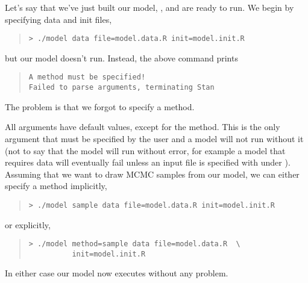 Let's say that we've just built our model, , and are ready to run.
We begin by specifying data and init files,
%
\begin{quote}
\begin{Verbatim}[fontshape=sl]
> ./model data file=model.data.R init=model.init.R
\end{Verbatim}
\end{quote}
%
but our model doesn't run.  Instead, the above command prints
%
\begin{quote}
\begin{Verbatim}
A method must be specified!
Failed to parse arguments, terminating Stan
\end{Verbatim}
\end{quote}
%
The problem is that we forgot to specify a method.

All \Stan arguments have default values, except for the method.  This
is the only argument that must be specified by the user and a model
will not run without it (not to say that the model will run without error,
for example a model that requires data will eventually fail unless an input file 
is specified with  under ).  Assuming that we want to draw
MCMC samples from our model, we can either specify a method
implicitly,
%
\begin{quote}
\begin{Verbatim}[fontshape=sl]
> ./model sample data file=model.data.R init=model.init.R
\end{Verbatim}
\end{quote}
%
or explicitly,
%
\begin{quote}
\begin{Verbatim}[fontshape=sl]
> ./model method=sample data file=model.data.R  \
          init=model.init.R
\end{Verbatim}
\end{quote}
%
In either case our model now executes without any problem.

